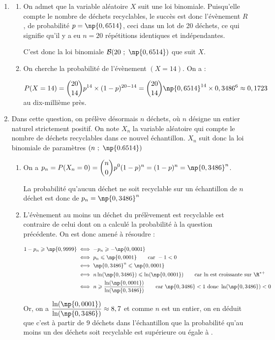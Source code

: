 \begin{enumerate}
\item
	\begin{enumerate}
		\item On admet que la variable aléatoire $X$ suit une loi binomiale. Puisqu'elle compte le nombre de déchets recyclables, le succès est donc l'évènement $R$, de probabilité $p = \np{0,6514}$, ceci dans un lot de 20 déchets, ce qui signifie qu'il y a eu $n = 20$ répétitions identiques et indépendantes.

C'est donc la loi binomiale $\mathcal{B}(20~;~\np{0,6514})$ que suit $X$.

		\item On cherche la probabilité de l'évènement $(X = 14)$. On a :

$P(X=14) = \displaystyle \binom{20}{14} p^{14}\times (1-p)^{20 - 14} = \binom{20}{14} \np{0,6514}^{14}\times 0,3486^{6} \approx 0,1723$ au dix-millième près.
	\end{enumerate}
\item Dans cette question, on prélève désormais $n$ déchets, où $n$ désigne un entier naturel strictement positif. On note $X_n$ la variable aléatoire qui compte le nombre de déchets recyclables dans ce nouvel échantillon. $X_n$ suit donc la loi binomiale de paramètres $(n~;~\np{0.6514})$
	\begin{enumerate}
		\item On a $p_{n} = P(X_n = 0) = \displaystyle \binom{n}{0} p^0 (1 - p)^{n} = (1 - p)^n = \np{0,3486}^n$.

La probabilité qu'aucun déchet ne soit recyclable sur un échantillon de $n$ déchet est donc de $p_n = \np{0,3486}^n$

		\item L'évènement \og au moins un déchet du prélèvement est recyclable \fg{} est contraire de celui dont on a calculé la probabilité à la question précédente. On est donc amené à résoudre :

$\aligned 1 - p_n \geqslant \np{0,9999} &\iff -p_n \geqslant -\np{0,0001}\\
&\iff p_n \leqslant \np{0,0001} \qquad \text{car }-1<0\\
&\iff \np{0,3486}^n \leqslant \np{0,0001}\\
&\iff n \ln(\np{0,3486}) \leqslant \ln(\np{0,0001}) \qquad \text{car ln est croissante sur } \R^{*+}\\
&\iff n \geqslant \dfrac{\ln(\np{0,0001})}{\ln(\np{0,3486})} \qquad \text{car } \np{0,3486}<1 \text{ donc } \ln(\np{0,3486})<0
\\ \endaligned$

Or, on a $\dfrac{\ln(\np{0,0001})}{\ln(\np{0,3486})} \approx 8,7$ et comme $n$ est un entier, on en déduit que c'est à partir de 9 déchets dans l'échantillon que la probabilité qu'au moins un des déchets soit recyclable est supérieure ou égale à .
	\end{enumerate}
\end{enumerate}

\bigskip

